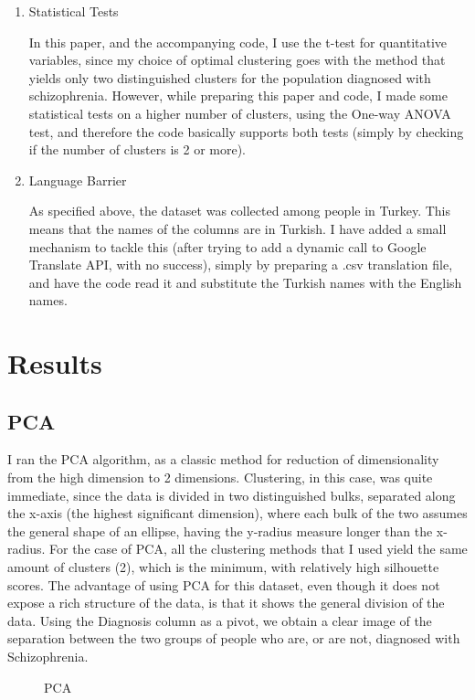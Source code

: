\documentclass{article}
\begin{document}
\begin{enumerate}
    \item Statistical Tests
    
    In this paper, and the accompanying code, I use the t-test for quantitative variables, since my choice of optimal clustering goes with the method that yields only two distinguished clusters for the population diagnosed with schizophrenia. However, while preparing this paper and code, I made some statistical tests on a higher number of clusters, using the One-way ANOVA test, and therefore the code basically supports both tests (simply by checking if the number of clusters is 2 or more).

    \item Language Barrier
    
    As specified above, the dataset was collected among people in Turkey. This means that the names of the columns are in Turkish. I have added a small mechanism to tackle this (after trying to add a dynamic call to Google Translate API, with no success), simply by preparing a .csv translation file, and have the code read it and substitute the Turkish names with the English names.
\end{enumerate}
\section{Results}
\subsection{PCA}
I ran the PCA algorithm, as a classic method for reduction of dimensionality from the high dimension to 2 dimensions. Clustering, in this case, was quite immediate, since the data is divided in two distinguished bulks, separated along the x-axis (the highest significant dimension), where each bulk of the two assumes the general shape of an ellipse, having the y-radius measure longer than the x-radius. For the case of PCA, all the clustering methods that I used yield the same amount of clusters (2), which is the minimum, with relatively high silhouette scores. The advantage of using PCA for this dataset, even though it does not expose a rich structure of the data, is that it shows the general division of the data. Using the Diagnosis column as a pivot, we obtain a clear image of the separation between the two groups of people who are, or are not, diagnosed with Schizophrenia.

\begin{figure}[H]
    \centering
    \caption{PCA}
\end{figure}
\end{document}
